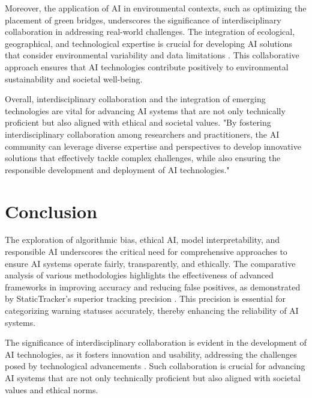Moreover, the application of AI in environmental contexts, such as optimizing the placement of green bridges, underscores the significance of interdisciplinary collaboration in addressing real-world challenges. The integration of ecological, geographical, and technological expertise is crucial for developing AI solutions that consider environmental variability and data limitations \cite{fluschnik2024placinggreenbridgesoptimally}. This collaborative approach ensures that AI technologies contribute positively to environmental sustainability and societal well-being.



Overall, interdisciplinary collaboration and the integration of emerging technologies are vital for advancing AI systems that are not only technically proficient but also aligned with ethical and societal values. "By fostering interdisciplinary collaboration among researchers and practitioners, the AI community can leverage diverse expertise and perspectives to develop innovative solutions that effectively tackle complex challenges, while also ensuring the responsible development and deployment of AI technologies." \cite{korre2023takesvillagemultidisciplinaritycollaboration}













\section{Conclusion} \label{sec:Conclusion}





The exploration of algorithmic bias, ethical AI, model interpretability, and responsible AI underscores the critical need for comprehensive approaches to ensure AI systems operate fairly, transparently, and ethically. The comparative analysis of various methodologies highlights the effectiveness of advanced frameworks in improving accuracy and reducing false positives, as demonstrated by StaticTracker's superior tracking precision \cite{li2024trackingevolutionstaticcode}. This precision is essential for categorizing warning statuses accurately, thereby enhancing the reliability of AI systems.



The significance of interdisciplinary collaboration is evident in the development of AI technologies, as it fosters innovation and usability, addressing the challenges posed by technological advancements \cite{korre2023takesvillagemultidisciplinaritycollaboration}. Such collaboration is crucial for advancing AI systems that are not only technically proficient but also aligned with societal values and ethical norms.



